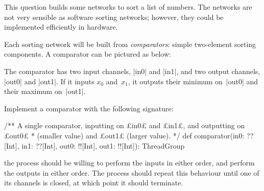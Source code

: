 \begin{question}
\label{ex:sorting}
\def\comp#1#2#3{%
  \draw (#1)+(#3,0) node {$\bullet$};
  \draw (#2)+(#3,0) node (n2) {$\bullet$};
  \draw[thick] (#1)+(#3,0) -- (n2.center);
}
This question builds some networks to sort a list of numbers.  The networks
are not very sensible as software sorting networks; however, they could be
implemented efficiently in hardware. 

Each sorting network will be built from \emph{comparators}: simple
two-element sorting components.  A comparator can be pictured as below: 
%
\begin{center}
\end{center}
%
The comparator has two input channels, |in0| and |in1|, and two output
channels, |out0| and |out1|.  If it inputs $x_0$ and~$x_1$, it outputs their
minimum on~|out0| and their maximum on~|out1|.

\begin{qpart} 
Implement a comparator with the following signature:
%
\begin{scala}
  /** A single comparator, inputting on £in0£ and £in1£, and outputting on £out0£
    * (smaller value) and £out1£ (larger value). */
  def comparator(in0: ??[Int], in1: ??[Int], out0: !![Int], out1: !![Int]): ThreadGroup
\end{scala}
%
the process should be willing to perform the inputs in either order, and
perform the outputs in either order.  The process should repeat this behaviour
until one of its channels is closed, at which point it should terminate.
\end{qpart}



\end{question}
